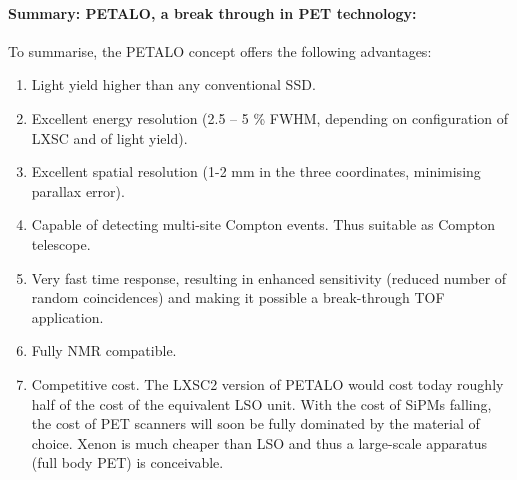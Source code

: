 \paragraph{Summary: PETALO, a break through in PET technology:}
To summarise, the PETALO concept offers the following advantages:
\begin{enumerate}
\item Light yield higher than any conventional SSD.
\item Excellent energy resolution (2.5 -- 5 \% FWHM, depending on configuration of LXSC and of light yield). 
\item Excellent spatial resolution (1-2 mm in the three coordinates, minimising parallax error).
\item Capable of detecting multi-site Compton events. Thus suitable as Compton telescope.
\item Very fast time response, resulting in enhanced sensitivity (reduced number of random coincidences) and making it possible a break-through TOF application. 
\item Fully NMR compatible. 
\item Competitive cost. The LXSC2 version of PETALO would cost today roughly half of the cost of the equivalent LSO unit. With the cost of SiPMs falling, the  cost of PET scanners will soon be fully dominated by the material of choice. Xenon is much cheaper than LSO and thus a large-scale apparatus (full body PET) is conceivable. 
\end{enumerate}

